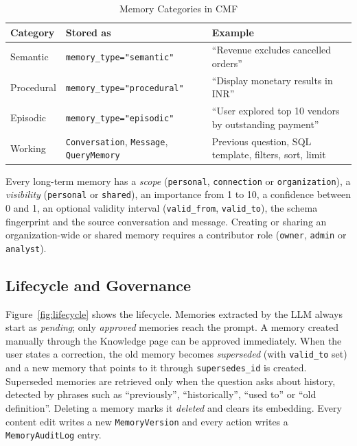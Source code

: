\begin{table}[H]
    \centering
    \small
    \caption{Memory Categories in CMF}
    \begin{tabular}{p{2.0cm} p{6.0cm} p{7.2cm}}
        \toprule
        \textbf{Category} & \textbf{Stored as} & \textbf{Example} \\
        \midrule
        Semantic   & \texttt{memory\_type="semantic"}   & ``Revenue excludes cancelled orders'' \\[3pt]
        Procedural & \texttt{memory\_type="procedural"} & ``Display monetary results in INR'' \\[3pt]
        Episodic   & \texttt{memory\_type="episodic"}   & ``User explored top 10 vendors by outstanding payment'' \\[3pt]
        Working    & \texttt{Conversation}, \texttt{Message}, \texttt{QueryMemory} & Previous question, SQL template, filters, sort, limit \\
        \bottomrule
    \end{tabular}
    \label{tab:memory_types}
\end{table}

Every long-term memory has a \textit{scope} (\texttt{personal}, \texttt{connection} or
\texttt{organization}), a \textit{visibility} (\texttt{personal} or \texttt{shared}), an
importance from 1 to 10, a confidence between 0 and 1, an optional validity interval
(\texttt{valid\_from}, \texttt{valid\_to}), the schema fingerprint and the source
conversation and message. Creating or sharing an organization-wide or shared memory
requires a contributor role (\texttt{owner}, \texttt{admin} or \texttt{analyst}).

\subsection{Lifecycle and Governance}
Figure~\ref{fig:lifecycle} shows the lifecycle. Memories extracted by the LLM always start
as \textit{pending}; only \textit{approved} memories reach the prompt. A memory created
manually through the Knowledge page can be approved immediately. When the user states a
correction, the old memory becomes \textit{superseded} (with \texttt{valid\_to} set) and a
new memory that points to it through \texttt{supersedes\_id} is created. Superseded
memories are retrieved only when the question asks about history, detected by phrases such
as ``previously'', ``historically'', ``used to'' or ``old definition''. Deleting a memory
marks it \textit{deleted} and clears its embedding. Every content edit writes a new
\texttt{MemoryVersion} and every action writes a \texttt{MemoryAuditLog} entry.

